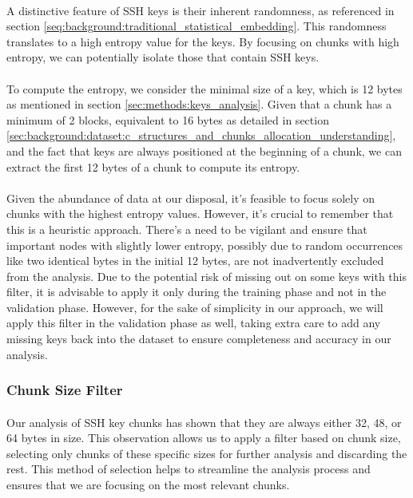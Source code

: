         \paragraph{}A distinctive feature of SSH keys is their inherent randomness, as referenced in section \ref{seq:background:traditional_statistical_embedding}. This randomness translates to a high entropy value for the keys. By focusing on chunks with high entropy, we can potentially isolate those that contain SSH keys.
        
        \paragraph{}To compute the entropy, we consider the minimal size of a key, which is 12 bytes as mentioned in section \ref{sec:methods:keys_analysis}. Given that a chunk has a minimum of 2 blocks, equivalent to 16 bytes as detailed in section \ref{sec:background:dataset:c_structures_and_chunks_allocation_understanding}, and the fact that keys are always positioned at the beginning of a chunk, we can extract the first 12 bytes of a chunk to compute its entropy.
        
        \paragraph{}Given the abundance of data at our disposal, it's feasible to focus solely on chunks with the highest entropy values. However, it's crucial to remember that this is a heuristic approach. There's a need to be vigilant and ensure that important nodes with slightly lower entropy, possibly due to random occurrences like two identical bytes in the initial 12 bytes, are not inadvertently excluded from the analysis. Due to the potential risk of missing out on some keys with this filter, it is advisable to apply it only during the training phase and not in the validation phase. However, for the sake of simplicity in our approach, we will apply this filter in the validation phase as well, taking extra care to add any missing keys back into the dataset to ensure completeness and accuracy in our analysis.
    \subsubsection{Chunk Size Filter}
        \paragraph{}Our analysis of SSH key chunks has shown that they are always either 32, 48, or 64 bytes in size. This observation allows us to apply a filter based on chunk size, selecting only chunks of these specific sizes for further analysis and discarding the rest. This method of selection helps to streamline the analysis process and ensures that we are focusing on the most relevant chunks.
        
